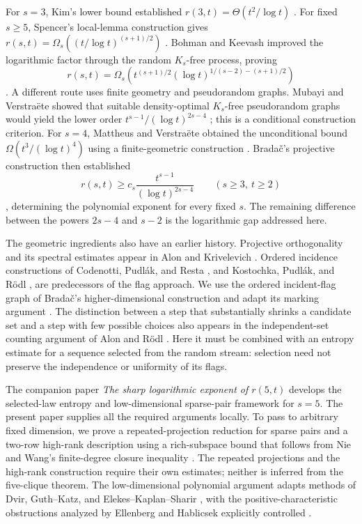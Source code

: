 For $s=3$, Kim's lower bound established
$r(3,t)=\Theta(t^2/\log t)$ \cite{Kim1995}.
For fixed $s\ge5$, Spencer's local-lemma construction gives
$r(s,t)=\Omega_s((t/\log t)^{(s+1)/2})$ \cite{Spencer1977}.
Bohman and Keevash improved the logarithmic factor through the random
$K_s$-free process, proving
\[
 r(s,t)=\Omega_s\!\left(
 t^{(s+1)/2}(\log t)^{1/(s-2)-(s+1)/2}\right)
\]
\cite[Theorem~1.2]{BohmanKeevash2010}.
A different route uses finite geometry and pseudorandom graphs.
Mubayi and Verstra\"ete showed that suitable density-optimal
$K_s$-free pseudorandom graphs would yield the lower order
$t^{s-1}/(\log t)^{2s-4}$ \cite[Corollary~2]{MubayiVerstraete2024}; this is a
conditional construction criterion.
For $s=4$, Mattheus and Verstra\"ete obtained the unconditional bound
$\Omega(t^3/(\log t)^4)$ using a finite-geometric construction
\cite{MattheusVerstraete2024}.
Brada\v{c}'s projective construction then established
\[
 r(s,t)\ge c_s\frac{t^{s-1}}{(\log t)^{2s-4}}
 \qquad(s\ge3,\ t\ge2)
\]
\cite[Theorem~1.1]{Bradac2026}, determining the polynomial exponent
for every fixed $s$. The remaining difference between the powers
$2s-4$ and $s-2$ is the logarithmic gap addressed here.

The geometric ingredients also have an earlier history.
Projective orthogonality and its spectral estimates appear in
Alon and Krivelevich \cite{AlonKrivelevich1997}.
Ordered incidence constructions of Codenotti, Pudl\'ak, and Resta
\cite{CodenottiPudlakResta2000}, and Kostochka, Pudl\'ak, and R\"odl
\cite{KostochkaPudlakRodl2010}, are predecessors of the flag approach.
We use the ordered incident-flag graph of Brada\v{c}'s
higher-dimensional construction \cite[Section~2.5]{Bradac2026}
and adapt its marking argument \cite[Claim~2.13]{Bradac2026}.
The distinction between a step that substantially shrinks a candidate
set and a step with few possible choices also appears in the
independent-set counting argument of Alon and R\"odl
\cite[proof of Theorem~2.1]{AlonRodl2005}. Here it must be combined with an entropy estimate
for a sequence selected from the random stream: selection need not
preserve the independence or uniformity of its flags.

The companion paper \emph{The sharp logarithmic exponent of $r(5,t)$}
\cite[Lemma~3.4 and Theorem~4.1]{RamseyFive} develops the selected-law entropy and
low-dimensional sparse-pair framework for $s=5$.
The present paper supplies all the required arguments locally.
To pass to arbitrary fixed dimension, we prove a repeated-projection
reduction for sparse pairs and a two-row high-rank description using
a rich-subspace bound that follows from Nie and Wang's finite-degree
closure inequality \cite{NieWang2015}.
The repeated projections and the high-rank construction require their
own estimates; neither is inferred from the five-clique theorem.
The low-dimensional polynomial argument adapts methods of Dvir,
Guth--Katz, and Elekes--Kaplan--Sharir
\cite{Dvir2009,GuthKatz2010,ElekesKaplanSharir2011}, with the
positive-characteristic obstructions analyzed by Ellenberg and
Hablicsek explicitly controlled \cite{EllenbergHablicsek2016}.

